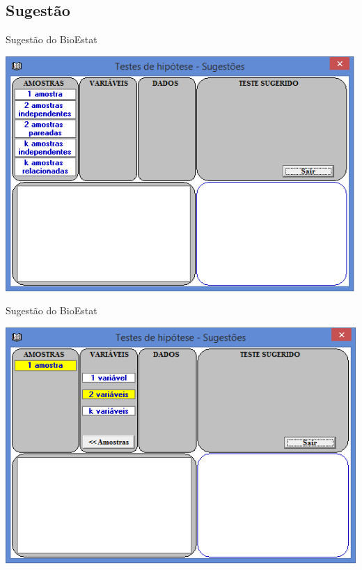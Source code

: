 \documentclass{beamer}
\begin{document}
\subsection{Sugestão}

\begin{frame}{Sugestão do BioEstat}
  \begin{center}
    \includegraphics[height=0.9\textheight]{sugestao1}
  \end{center}
\end{frame}

\begin{frame}{Sugestão do BioEstat}
  \begin{center}
    \includegraphics[height=0.9\textheight]{sugestao2}
  \end{center}
\end{frame}
\end{document}
